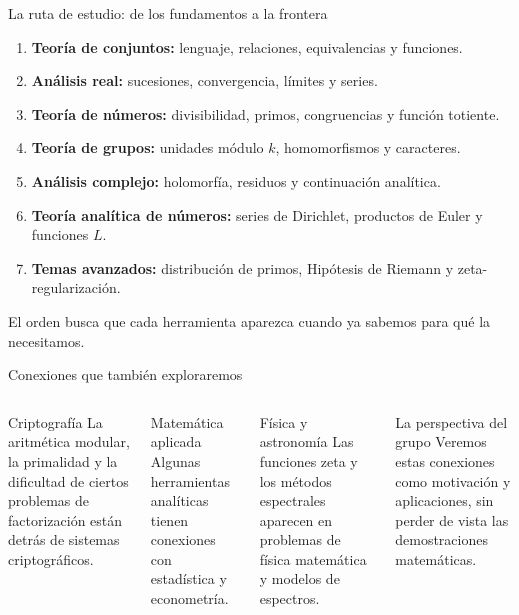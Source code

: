\documentclass[aspectratio=169,11pt]{beamer}
\begin{document}
\begin{frame}{La ruta de estudio: de los fundamentos a la frontera}
    \begin{enumerate}
        \item \textbf{Teoría de conjuntos:} lenguaje, relaciones, equivalencias y funciones.
        \item \textbf{Análisis real:} sucesiones, convergencia, límites y series.
        \item \textbf{Teoría de números:} divisibilidad, primos, congruencias y función totiente.
        \item \textbf{Teoría de grupos:} unidades módulo $k$, homomorfismos y caracteres.
        \item \textbf{Análisis complejo:} holomorfía, residuos y continuación analítica.
        \item \textbf{Teoría analítica de números:} series de Dirichlet, productos de Euler y funciones $L$.
        \item \textbf{Temas avanzados:} distribución de primos, Hipótesis de Riemann y zeta-regularización.
    \end{enumerate}
    \centering\small El orden busca que cada herramienta aparezca cuando ya sabemos para qué la necesitamos.
\end{frame}

\begin{frame}{Conexiones que también exploraremos}
    \begin{columns}[T,onlytextwidth]
        \begin{block}{Criptografía}
            La aritmética modular, la primalidad y la dificultad de ciertos problemas de factorización están detrás de sistemas criptográficos.
        \end{block}
        \begin{exampleblock}{Matemática aplicada}
            Algunas herramientas analíticas tienen conexiones con estadística y econometría.
        \end{exampleblock}
        \begin{block}{Física y astronomía}
            Las funciones zeta y los métodos espectrales aparecen en problemas de física matemática y modelos de espectros.
        \end{block}
        \begin{alertblock}{La perspectiva del grupo}
            Veremos estas conexiones como motivación y aplicaciones, sin perder de vista las demostraciones matemáticas.
        \end{alertblock}
    \end{columns}
\end{frame}
\end{document}
